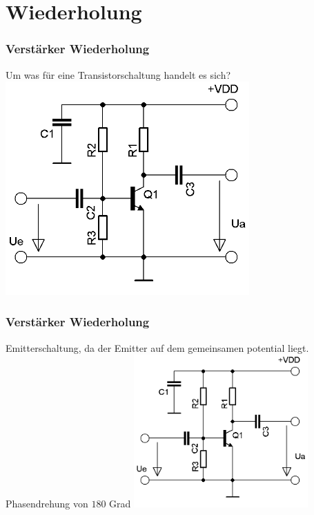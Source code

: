 

\subtitle{Technik A07: \\
           Oszillator und Hochfrequenzverstärker \\[2em]}
\date{Stand 17.5.2015}


\section*{Wiederholung}

\begin{frame}
    \frametitle{Verstärker Wiederholung}
    \begin{center}
    \large Um was für eine Transistorschaltung handelt es sich?
        \includegraphics[width=0.7\textwidth]{a07/Transistor_Verstaerker_emetter.png}
	\end{center}
\end{frame}

\begin{frame}
    \frametitle{Verstärker Wiederholung}
    \begin{center}
    \large Emitterschaltung, da der Emitter auf dem gemeinsamen potential liegt.\\
    Phasendrehung von $180$ Grad
        \includegraphics[width=0.5\textwidth]{a07/Transistor_Verstaerker_emetter.png}
	\end{center}
\end{frame}

